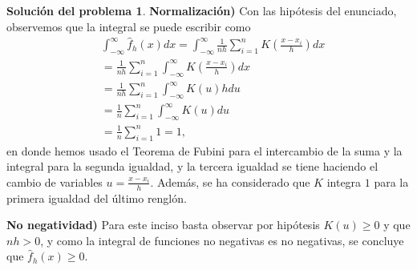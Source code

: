 \documentclass[twoside,12pt]{article}
\theoremstyle{definition}
\newtheorem{soln}{Solución del problema}
\begin{document}
\newpage
\begin{soln}
\textbf{Normalización)} Con las hipótesis del enunciado, observemos que la integral se puede escribir como
\[
\begin{split}
  & \int_{-\infty}^{\infty} \hat{f}_h(x) d x=\int_{-\infty}^{\infty} \frac{1}{nh} \sum_{i=1}^n K\left(\frac{x-x_i}{h}\right) d x \\
  &=  \frac{1}{n h}\sum_{i=1}^n  \int_{-\infty}^{\infty} K\left(\frac{x-x_i}{h}\right) d x \\
  &= \frac{1}{n h}\sum_{i=1}^n  \int_{-\infty}^{\infty} K(u) h d u \\
  &=  \frac{1}{n}\sum_{i=1}^n  \int_{-\infty}^{\infty} K(u) d u \\
  &=  \frac{1}{n}\sum_{i=1}^n 1=1,
\end{split}
\]
en donde hemos usado el Teorema de Fubini para el intercambio de la suma y la integral para la segunda igualdad, y la tercera igualdad se tiene haciendo el cambio de variables $u=\frac{x-x_i}{h}$. Además, se ha considerado que $K$ integra $1$ para la primera igualdad del último renglón.

\textbf{No negatividad)} Para este inciso basta observar por hipótesis $K(u) \geq 0$ y que $nh>0$, y como la integral de funciones no negativas es no negativas, se concluye que $\hat{f}_h(x)\geq 0$.


\end{soln}
\end{document}
